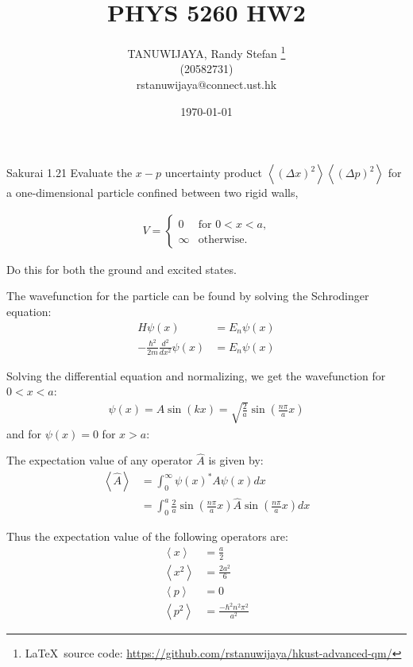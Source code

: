 \documentclass{article}
\title{PHYS 5260 HW2}
\author{TANUWIJAYA, Randy Stefan \footnote{\LaTeX\ source code: \url{https://github.com/rstanuwijaya/hkust-advanced-qm/}}
\\ (20582731) \\ rstanuwijaya@connect.ust.hk}
\affil{Department of Physics - HKUST}
\date{\today}
\begin{document}
\maketitle
\newcommand{\expc}[1]{\left<#1\right>}

\begin{section}{Sakurai 1.21}
\newcommand{\wf}{\sin \left( \frac{n \pi}{a} x \right)}
Evaluate the $x-p$ uncertainty product $\expc{(\Delta x)^2} \expc{(\Delta p)^2}$ for a one-dimensional particle confined between two rigid walls,

\begin{align*}
	V = \begin{cases}
		    0      & \text{for $0 < x < a$,} \\
		    \infty & \text{otherwise.}
	    \end{cases}
\end{align*}

Do this for both the ground and excited states.
\begin{tcolorbox}[breakable]
	The wavefunction for the particle can be found by solving the Schrodinger equation:
	\begin{align*}
		H \psi(x)                                     & = E_n \psi(x) \\
		- \frac{\hbar^2}{2m} \frac{d^2}{dx^2} \psi(x) & = E_n \psi(x)
	\end{align*}

	Solving the differential equation and normalizing, we get the wavefunction for $0 < x < a$:
	\begin{align*}
		\psi(x) = A \sin \left( k x \right) = \sqrt{\frac{2}{a}} \wf
	\end{align*}
	and for $\psi(x) = 0$ for $x > a$:

	The expectation value of any operator $\hat A$ is given by:
	\begin{align*}
		\expc{\hat A} & = \int_0^\infty \psi(x)^* A \psi(x) dx   \\
		              & = \int_0^a \frac{2}{a} \wf \hat A \wf dx
	\end{align*}

	Thus the expectation value of the following operators are:
	\begin{align*}
		\expc{x}   & = \frac{a}{2}                    \\
		\expc{x^2} & = \frac{2a^2}{6}                 \\
		\expc{p}   & = 0                              \\
		\expc{p^2} & = \frac{-\hbar^2 n^2 \pi^2}{a^2}
	\end{align*}


\end{tcolorbox}
\end{section}
\end{document}
